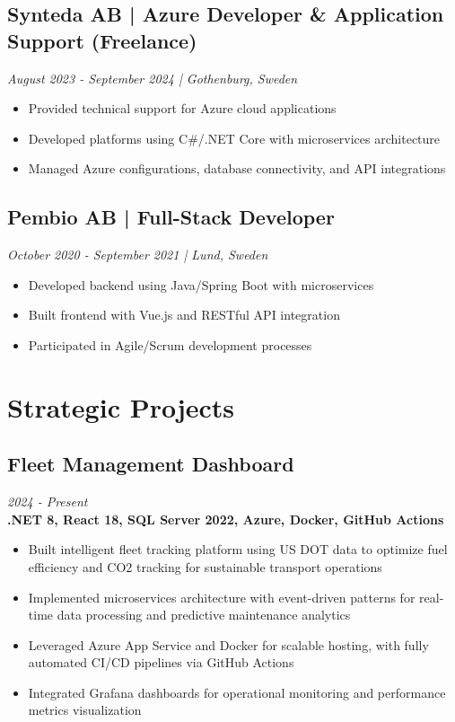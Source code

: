 \documentclass[11pt,a4paper]{article}
\begin{document}
\subsection*{Synteda AB | Azure Developer \& Application Support (Freelance)}
\textit{August 2023 - September 2024 | Gothenburg, Sweden}

\begin{itemize}[leftmargin=*, itemsep=2pt]
\item Provided technical support for Azure cloud applications
\item Developed platforms using C\#/.NET Core with microservices architecture
\item Managed Azure configurations, database connectivity, and API integrations
\end{itemize}

\subsection*{Pembio AB | Full-Stack Developer}
\textit{October 2020 - September 2021 | Lund, Sweden}

\begin{itemize}[leftmargin=*, itemsep=2pt]
\item Developed backend using Java/Spring Boot with microservices
\item Built frontend with Vue.js and RESTful API integration
\item Participated in Agile/Scrum development processes
\end{itemize}

\section*{Strategic Projects}

\subsection*{Fleet Management Dashboard}
\textit{2024 - Present} \\
\textbf{.NET 8, React 18, SQL Server 2022, Azure, Docker, GitHub Actions}

\begin{itemize}[leftmargin=*, itemsep=2pt]
\item Built intelligent fleet tracking platform using US DOT data to optimize fuel efficiency and CO2 tracking for sustainable transport operations
\item Implemented microservices architecture with event-driven patterns for real-time data processing and predictive maintenance analytics
\item Leveraged Azure App Service and Docker for scalable hosting, with fully automated CI/CD pipelines via GitHub Actions
\item Integrated Grafana dashboards for operational monitoring and performance metrics visualization
\end{itemize}
\end{document}
